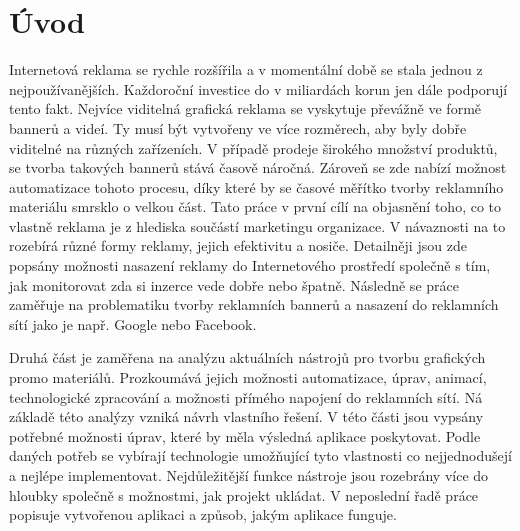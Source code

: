 \chapter{Úvod}
\label{chap:Introduction}
Internetová reklama se rychle rozšířila a v momentální době se stala jednou z nejpoužívanějších. Každoroční investice do v miliardách korun jen dále podporují tento fakt.
Nejvíce viditelná grafická reklama se vyskytuje převážně ve formě bannerů a videí. Ty musí být vytvořeny ve více rozměrech, aby byly dobře viditelné na různých zařízeních.
V případě prodeje širokého množství produktů, se tvorba takových bannerů stává časově náročná. Zároveň se zde nabízí možnost automatizace tohoto procesu, díky které by se 
časové měřítko tvorby reklamního materiálu smrsklo o velkou část.
Tato práce v první cílí na objasnění toho, co to vlastně reklama je z hlediska součástí marketingu organizace. V návaznosti na to rozebírá různé formy reklamy, jejich efektivitu
a nosiče. Detailněji jsou zde popsány možnosti nasazení reklamy do Internetového prostředí společně s tím, jak monitorovat zda si inzerce vede dobře nebo špatně.
Následně se práce zaměřuje na problematiku tvorby reklamních bannerů a nasazení do reklamních sítí jako je např. Google nebo Facebook.

Druhá část je zaměřena na analýzu aktuálních nástrojů pro tvorbu grafických promo materiálů. Prozkoumává jejich možnosti automatizace, úprav, animací, technologické zpracování a možnosti
přímého napojení do reklamních sítí.
Ná základě této analýzy vzniká návrh vlastního řešení. V této části jsou vypsány potřebné možnosti úprav, které by měla výsledná aplikace poskytovat. Podle daných potřeb
se vybírají technologie umožňující tyto vlastnosti co nejjednodušejí a nejlépe implementovat. Nejdůležitější funkce nástroje jsou rozebrány více do hloubky společně s možnostmi,
jak projekt ukládat.
V neposlední řadě práce popisuje vytvořenou aplikaci a způsob, jakým aplikace funguje.


\endinput